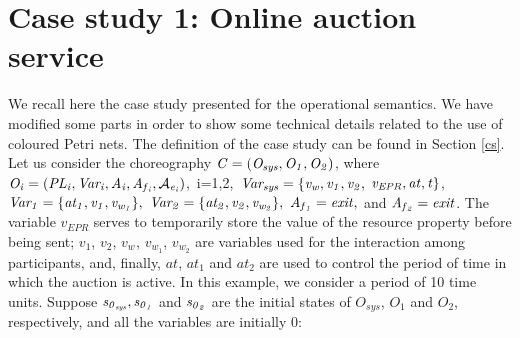 \section*{Case study 1: Online auction service}\label{cspetri}
We recall here the case study presented for the operational semantics. We have modified some parts in order to show some technical details related to
the use of coloured Petri nets. The definition of the case study can be found in Section \ref{cs}.
Let us consider the choreography ${\it C=(O_{sys},O_1,O_2)}$, where 
${\it O_i=(PL_i,Var_i,A_i,A_{f{_i}},\mathcal{A}_{e{_i}})}$,~i=1,2,~${\it Var_{sys}=\{v_w,v_1,v_2,}$
${\it v_{EPR},at,t\}}$,~${\it Var_1=\{at_1,v_1,v_{w{_1}}\},\ Var_2=\{at_2,v_2,v_{w_{2}}\},\ A_{f{_1}}=exit,}$ and
${\it A_{f{_2}}=exit}$. The variable $v_{EPR}$ serves to temporarily store the value of the resource property before being sent; $v_1$, $v_2$, $v_{w_{}}$, $v_{w_{1}}$, $v_{w_{2}}$ are variables used for the interaction among participants, and, finally, $at$, $at_1$ and $at_2$ are used to control the period of time in which the auction is active. In this example, we consider a period of 10 time units. Suppose ${\it s_{0{_{sys}}}, s_{0{_1}}}$ and ${\it s_{0{_2}}}$ are the initial states of $O_{sys}$, $O_1$ and $O_2$, respectively, and all the variables are initially $0$: \\[-0.2cm]


